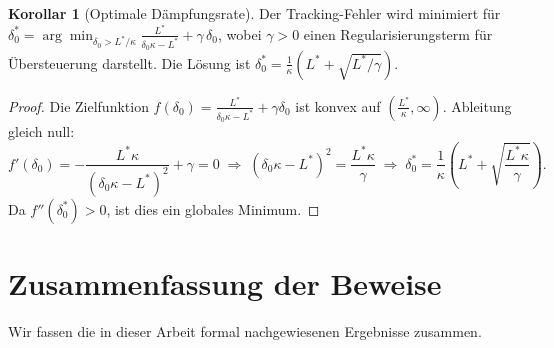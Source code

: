 ﻿\documentclass[a4paper,12pt]{article}
\theoremstyle{definition}
\newtheorem{korollar}{Korollar}
\begin{document}
\begin{korollar}[Optimale Dämpfungsrate]
\label{kor:deltaOpt}
    Der Tracking-Fehler wird minimiert für
    $\delta_0^* = \arg\min_{\delta_0 > L^*/\kappa}
    \frac{L^*}{\delta_0\kappa - L^*} + \gamma\,\delta_0$,
    wobei $\gamma > 0$ einen Regularisierungsterm für Übersteuerung darstellt.
    Die Lösung ist $\delta_0^* = \frac{1}{\kappa}\!\left(L^* + \sqrt{L^*/\gamma}\right)$.
\end{korollar}

\begin{proof}
    Die Zielfunktion $f(\delta_0) = \frac{L^*}{\delta_0\kappa - L^*} + \gamma\delta_0$
    ist konvex auf $(\frac{L^*}{\kappa}, \infty)$. Ableitung gleich null:
    \[
        f'(\delta_0) = -\frac{L^*\kappa}{(\delta_0\kappa - L^*)^2} + \gamma = 0
        \;\Rightarrow\;
        (\delta_0\kappa - L^*)^2 = \frac{L^*\kappa}{\gamma}
        \;\Rightarrow\;
        \delta_0^* = \frac{1}{\kappa}\!\left(L^* + \sqrt{\frac{L^*\kappa}{\gamma}}\right).
    \]
    Da $f''(\delta_0^*) > 0$, ist dies ein globales Minimum.
\end{proof}

\section{Zusammenfassung der Beweise}

Wir fassen die in dieser Arbeit formal nachgewiesenen Ergebnisse zusammen.
\end{document}
